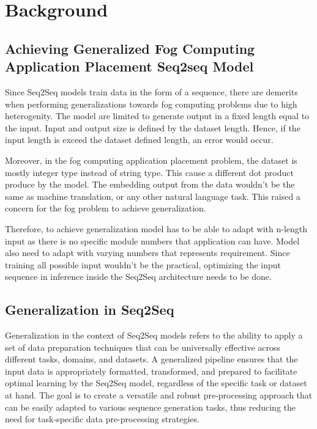\documentclass[conference]{IEEEtran}
\begin{document}
\section{Background}

\subsection{Achieving Generalized Fog Computing Application Placement Seq2seq Model}

Since Seq2Seq models train data in the form of a sequence, there are demerits when performing generalizations towards fog computing problems due to high heterogenity. The model are limited to generate output in a fixed length equal to the input. Input and output size is defined by the dataset length. Hence, if the input length is exceed the dataset defined length, an error would occur. 

Moreover, in the fog computing application placement problem, the dataset is mostly integer type instead of string type. This cause a different dot product produce by the model. The embedding output from the data wouldn't be the same as machine translation, or any other natural language task. This raised a concern for the fog problem to achieve generalization.

Therefore, to achieve generalization model has to be able to adapt with n-length input as there is no specific module numbers that application can have. Model also need to adapt with varying numbers that represents requirement. Since training all possible input wouldn't be the practical, optimizing the input sequence in inference inside the Seq2Seq architecture needs to be done.

\subsection{Generalization in Seq2Seq}

Generalization in the context of Seq2Seq models refers to the ability to apply a set of data preparation techniques that can be universally effective across different tasks, domains, and datasets. A generalized pipeline ensures that the input data is appropriately formatted, transformed, and prepared to facilitate optimal learning by the Seq2Seq model, regardless of the specific task or dataset at hand. The goal is to create a versatile and robust pre-processing approach that can be easily adapted to various sequence generation tasks, thus reducing the need for task-specific data pre-processing strategies.
\end{document}
